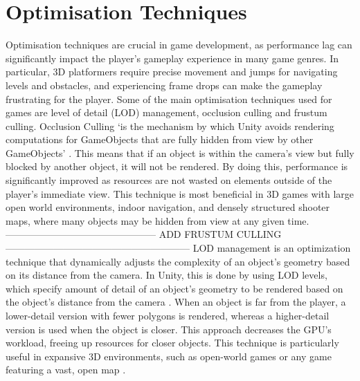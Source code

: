 \documentclass[]{final_report}
\begin{document}
\section{Optimisation Techniques}
\color{red}
Optimisation techniques are crucial in game development, as performance lag can significantly impact the player's gameplay experience in many game genres. In particular, 3D platformers require precise movement and jumps for navigating levels and obstacles, and experiencing frame drops can make the gameplay frustrating for the player. Some of the main optimisation techniques used for games are level of detail (LOD) management, occlusion culling and frustum culling. \newline
Occlusion Culling ‘is the mechanism by which Unity avoids rendering computations for GameObjects that are fully hidden from view by other GameObjects’ \cite{Singh2022}. This means that if an object is within the camera's view but fully blocked by another object, it will not be rendered. By doing this, performance is significantly improved as resources are not wasted on elements outside of the player's immediate view. This technique is most beneficial in 3D games with large open world environments, indoor navigation, and densely structured shooter maps, where many objects may be hidden from view at any given time.
----------------------------------------------- ADD FRUSTUM CULLING ---------------------------------------------------------
LOD management is an optimization technique that dynamically adjusts the complexity of an object's geometry based on its distance from the camera. In Unity, this is done by using LOD levels, which specify amount of detail of an object’s geometry to be rendered based on the object’s distance from the camera \cite{Unity2024LOD}. When an object is far from the player, a lower-detail version with fewer polygons is rendered, whereas a higher-detail version is used when the object is closer. This approach decreases the GPU's workload, freeing up resources for closer objects. This technique is particularly useful in expansive 3D environments, such as open-world games or any game featuring a vast, open map \cite{IndieGamesDevel}.
\color{black}
\end{document}
